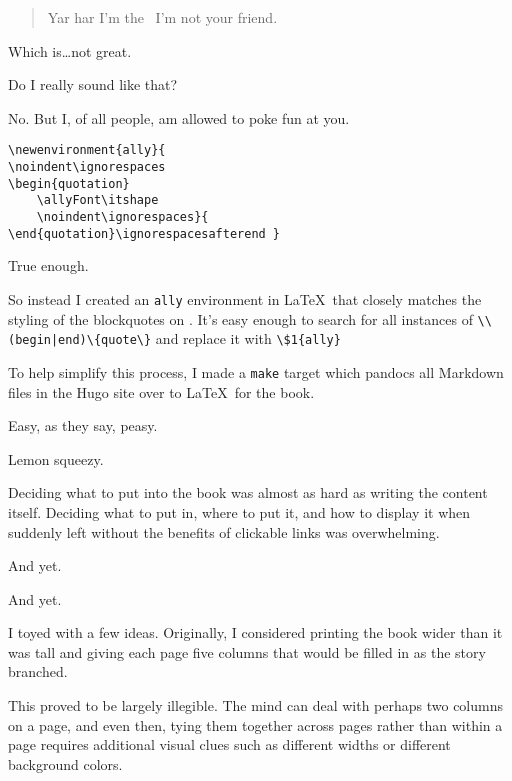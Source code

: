 \begin{paracol}{2}
\begin{leftcolumn}
\begin{quote}
  Yar har I'm the \allyWord\ I'm not your friend.
\end{quote}
Which is\ldots{}not great.

\begin{ally}
  Do I really sound like that?
\end{ally}
No. But I, of all people, am allowed to poke fun at you.
\end{leftcolumn}
\begin{rightcolumn*}
\begin{verbatim}
\newenvironment{ally}{
\noindent\ignorespaces
\begin{quotation}
    \allyFont\itshape
    \noindent\ignorespaces}{
\end{quotation}\ignorespacesafterend }
\end{verbatim}
\end{rightcolumn*}
\begin{leftcolumn}

\begin{ally}
  True enough.
\end{ally}
So instead I created an \texttt{ally} environment in \LaTeX\ that closely matches the styling of the blockquotes on \allyId. It's easy enough to search for all instances of \texttt{\textbackslash\textbackslash(begin|end)\textbackslash\{quote\textbackslash\}} and replace it with \texttt{\textbackslash\$1\{ally\}}

To help simplify this process, I made a \texttt{make} target which pandocs all Markdown files in the Hugo site over to \LaTeX\ for the book. 

\begin{ally}
  Easy, as they say, peasy.
\end{ally}
Lemon squeezy.
\newpage

Deciding what to put into the book was almost as hard as writing the content itself. Deciding what to put in, where to put it, and how to display it when suddenly left without the benefits of clickable links was overwhelming.

\begin{ally}
  And yet.
\end{ally}
And yet.

I toyed with a few ideas. Originally, I considered printing the book wider than it was tall and giving each page five columns that would be filled in as the story branched.

This proved to be largely illegible. The mind can deal with perhaps two columns on a page, and even then, tying them together across pages rather than within a page requires additional visual clues such as different widths or different background colors.


\end{leftcolumn}
\end{paracol}
